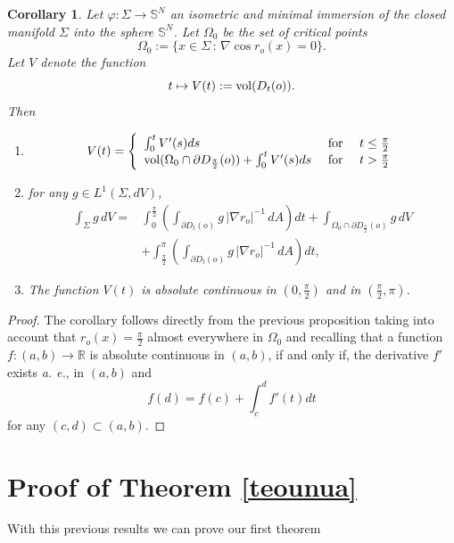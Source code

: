 \documentclass{amsart}
\newtheorem{corollary}[theorem]{Corollary}
\theoremstyle{definition}
\theoremstyle{remark}
\begin{document}
\begin{corollary}\label{corabs}
Let $\varphi:\Sigma\to\mathbb{S}^N$ an isometric and minimal immersion of the closed manifold $\Sigma$ into the sphere $\mathbb{S}^N$. Let $\Omega_0$ be the set of critical points 
$$
\Omega_0:=\{x\in\Sigma\, :\,\nabla \cos r_o(x)=0\}.
$$
Let $V$ denote the function 
$$
t\mapsto V(t):={\rm vol}(D_t(o)).
$$
Then
\begin{enumerate}
    \item 
    $$
    V(t)=\left\lbrace\begin{array}{lcr}
    \int_0^{t}V'(s)ds& \text{ for }& t\leq \frac{\pi}{2}\\
    {\rm vol}(\Omega_0\cap \partial D_{\frac{\pi}{2}}(o))+\int_0^{t}V'(s) ds& \text{ for }& t>\frac{\pi}{2}
    \end{array}\right.
    $$
    \item for any $g\in L^1(\Sigma,dV)$,
    $$
    \begin{aligned}
    \int_{\Sigma}g\,dV= &\int_{0}^{\frac{\pi}{2}}\left(\int_{\partial D_t(o)}g\,|\nabla r_o|^{-1}\,dA\right)dt
+\int_{\Omega_0\cap \partial D_{\frac{\pi}{2}}(o)}g\,dV\\ &+\int_{\frac{\pi}{2}}^\pi\left(\int_{\partial D_t(o)}g\,|\nabla r_o|^{-1}\,dA\right)dt,
    \end{aligned}$$
    \item The function $V(t)$ is absolute continuous in $(0,\frac{\pi}{2})$ and in $(\frac{\pi}{2},\pi)$.
    
\end{enumerate}
\end{corollary}
\begin{proof}
The corollary follows directly from the previous proposition taking into account that $r_o(x)=\frac{\pi}{2}$ almost everywhere in $\Omega_0$ and recalling that a function $f:(a,b)\to \mathbb{R}$ is absolute continuous in $(a,b)$, if and only if, the derivative $f'$ exists \emph{a. e.}, in $(a,b)$ and
$$
f(d)=f(c)+\int_c^df'(t)dt
$$
for any $(c,d)\subset (a,b)$.
\end{proof}

\section{Proof of Theorem \ref{teounua}}

With this previous results we can prove our first theorem
\end{document}
